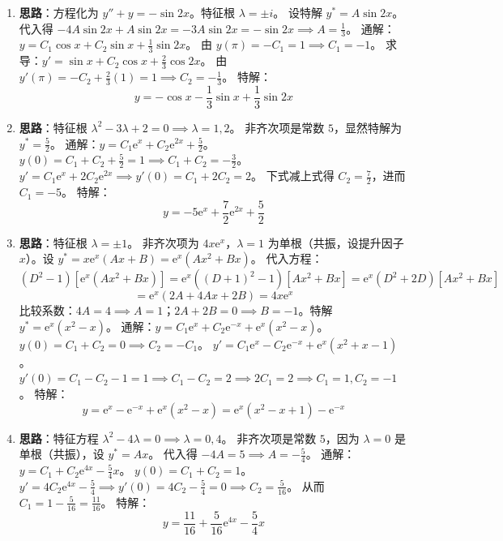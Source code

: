 \documentclass[lang=cn,11pt]{elegantbook}
\begin{document}
\begin{solution}
\begin{enumerate}
    \item[(1)] \textbf{思路}：方程化为 $y''+y=-\sin 2x$。特征根 $\lambda=\pm i$。
    设特解 $y^* = A\sin 2x$。代入得 $-4A\sin 2x + A\sin 2x = -3A\sin 2x = -\sin 2x \implies A = \frac{1}{3}$。
    通解：$y = C_1\cos x + C_2\sin x + \frac{1}{3}\sin 2x$。
    由 $y(\pi) = -C_1 = 1 \implies C_1 = -1$。
    求导：$y' = \sin x + C_2\cos x + \frac{2}{3}\cos 2x$。
    由 $y'(\pi) = -C_2 + \frac{2}{3}(1) = 1 \implies C_2 = -\frac{1}{3}$。
    特解：
    \[
    y = -\cos x - \frac{1}{3}\sin x + \frac{1}{3}\sin 2x
    \]

    \item[(2)] \textbf{思路}：特征根 $\lambda^2-3\lambda+2=0 \implies \lambda=1, 2$。
    非齐次项是常数 $5$，显然特解为 $y^* = \frac{5}{2}$。
    通解：$y = C_1\mathrm{e}^x + C_2\mathrm{e}^{2x} + \frac{5}{2}$。
    $y(0) = C_1 + C_2 + \frac{5}{2} = 1 \implies C_1 + C_2 = -\frac{3}{2}$。
    $y' = C_1\mathrm{e}^x + 2C_2\mathrm{e}^{2x} \implies y'(0) = C_1 + 2C_2 = 2$。
    下式减上式得 $C_2 = \frac{7}{2}$，进而 $C_1 = -5$。
    特解：
    \[
    y = -5\mathrm{e}^x + \frac{7}{2}\mathrm{e}^{2x} + \frac{5}{2}
    \]

    \item[(3)] \textbf{思路}：特征根 $\lambda=\pm 1$。
    非齐次项为 $4x\mathrm{e}^x$，$\lambda=1$ 为单根（共振，设提升因子 $x$）。设 $y^* = x\mathrm{e}^x(Ax+B) = \mathrm{e}^x(Ax^2+Bx)$。
    代入方程：
    \[
    (D^2-1)[\mathrm{e}^x(Ax^2+Bx)] = \mathrm{e}^x((D+1)^2-1)[Ax^2+Bx] = \mathrm{e}^x(D^2+2D)[Ax^2+Bx]
    \]
    \[
    = \mathrm{e}^x (2A + 4Ax + 2B) = 4x\mathrm{e}^x
    \]
    比较系数：$4A=4 \implies A=1$；$2A+2B=0 \implies B=-1$。特解 $y^* = \mathrm{e}^x(x^2-x)$。
    通解：$y = C_1\mathrm{e}^x + C_2\mathrm{e}^{-x} + \mathrm{e}^x(x^2-x)$。
    $y(0) = C_1 + C_2 = 0 \implies C_2 = -C_1$。
    $y' = C_1\mathrm{e}^x - C_2\mathrm{e}^{-x} + \mathrm{e}^x(x^2+x-1)$。
    $y'(0) = C_1 - C_2 - 1 = 1 \implies C_1 - C_2 = 2 \implies 2C_1 = 2 \implies C_1 = 1, C_2 = -1$。
    特解：
    \[
    y = \mathrm{e}^x - \mathrm{e}^{-x} + \mathrm{e}^x(x^2-x) = \mathrm{e}^x(x^2-x+1) - \mathrm{e}^{-x}
    \]

    \item[(4)] \textbf{思路}：特征方程 $\lambda^2-4\lambda=0 \implies \lambda=0, 4$。
    非齐次项是常数 $5$，因为 $\lambda=0$ 是单根（共振），设 $y^* = Ax$。
    代入得 $-4A = 5 \implies A = -\frac{5}{4}$。
    通解：$y = C_1 + C_2\mathrm{e}^{4x} - \frac{5}{4}x$。
    $y(0) = C_1 + C_2 = 1$。
    $y' = 4C_2\mathrm{e}^{4x} - \frac{5}{4} \implies y'(0) = 4C_2 - \frac{5}{4} = 0 \implies C_2 = \frac{5}{16}$。
    从而 $C_1 = 1 - \frac{5}{16} = \frac{11}{16}$。
    特解：
    \[
    y = \frac{11}{16} + \frac{5}{16}\mathrm{e}^{4x} - \frac{5}{4}x
    \]
\end{enumerate}
\end{solution}
\end{document}
